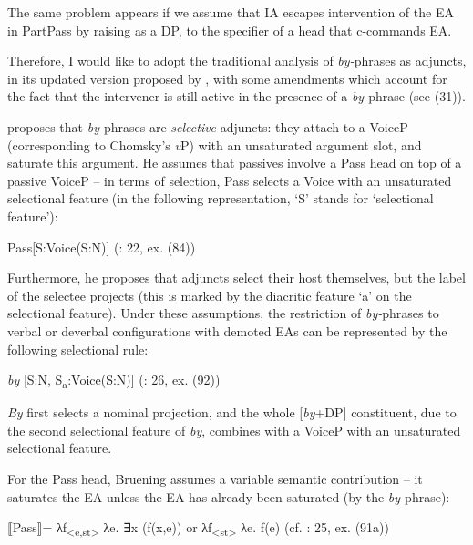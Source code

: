 \documentclass[output=paper]{langsci/langscibook}
\begin{document}
  The same problem appears if we assume that IA escapes intervention of the EA in PartPass by raising as a DP, to the specifier of a head that c-commands EA.

  Therefore, I would like to adopt the traditional analysis of \textit{by-}phrases as adjuncts, in its updated version proposed by \citet{Bruening2012}, with some amendments which account for the fact that the intervener is still active in the presence of a \textit{by-}phrase (see (31)).

    \z

\citet{Bruening2012} proposes that \textit{by-}phrases are \textit{selective} adjuncts: they attach to a VoiceP (corresponding to Chomsky’s \textit{v}P) with an unsaturated argument slot, and saturate this argument. He assumes that passives involve a Pass head on top of a passive VoiceP – in terms of selection, Pass selects a Voice with an unsaturated selectional feature (in the following representation, ‘S' stands for ‘selectional feature'):

\ea%
    \label{ex:giurgea:32}
    Pass[S:Voice(S:N)]  (\citealt{Bruening2012}: 22, ex. (84))
\z

Furthermore, he proposes that adjuncts select their host themselves, but the label of the selectee projects (this is marked by the diacritic feature ‘a' on the selectional feature). Under these assumptions, the restriction of \textit{by-}phrases to verbal or deverbal configurations with demoted EAs can be represented by the following selectional rule:

\ea%
    \label{ex:giurgea:33}
    \textit{by} [S:N, S\textsubscript{a}:Voice(S:N)]  (\citealt{Bruening2012}: 26, ex. (92))
\z

\textit{By} first selects a nominal projection, and the whole [\textit{by}+DP] constituent, due to the second selectional feature of \textit{by}, combines with a VoiceP with an unsaturated selectional feature. 

For the Pass head, Bruening assumes a variable semantic contribution – it saturates the EA unless the EA has already been saturated (by the \textit{by-}phrase):

\ea%
    \label{ex:giurgea:34}
    ⟦Pass⟧= λf\textsubscript{<e,st>} λe. ∃x (f(x,e))  or  λf\textsubscript{<st>} λe. f(e)   (cf. \citealt{Bruening2012}: 25, ex. (91a))
\z
    
\end{document}

